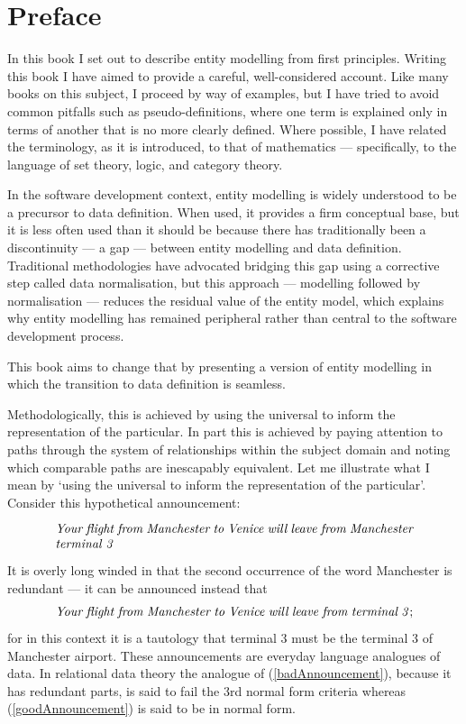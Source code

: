 

\section{Preface}

In this book I set out to describe entity modelling from first principles.
Writing this book I have aimed to provide a careful, well-considered account. 
Like many books on this subject, I proceed by way of examples, but I have tried to avoid common pitfalls such as pseudo-definitions, where one term is explained only in terms of another that is no more clearly defined. Where possible, I have related the terminology, as it is introduced, to that of mathematics --- specifically, to the language of set theory, logic, and category theory.

In the software development context, entity modelling is widely understood to be a precursor to data definition. When used, it provides a firm conceptual base, but it is less often used than it should be because there has traditionally been a discontinuity --- a gap --- between entity modelling and data definition. Traditional methodologies have advocated bridging this gap using a corrective step called data normalisation, but this approach --- modelling followed by normalisation --- reduces the residual value of the entity model, which explains why entity modelling has remained peripheral rather  than  central to the software development process.

This book aims to change that by presenting a version of entity modelling in which the transition to data definition is seamless.

Methodologically, this is achieved by using the universal to inform the representation of the particular.
In part this is achieved by paying attention to paths through the system of relationships within the subject domain and noting which comparable paths are inescapably equivalent. Let me illustrate what I mean by `using the universal to inform the representation of the particular'. Consider this hypothetical announcement: 

\begin{equation}
\label{badAnnouncement}
\parbox{10cm}{\textit{Your flight from Manchester to Venice will leave 
from Manchester terminal 3 }}
\end{equation}

It is overly long winded in that the second occurrence of the word Manchester is redundant --- it can be announced instead that
\begin{equation}
\label{goodAnnouncement}
\parbox{10cm}{\textit{Your flight from Manchester to Venice will leave 
from terminal 3};} 
\end{equation}
for in this context it is a tautology that terminal 3 must be the terminal 3 of Manchester airport. 
These announcements are everyday language analogues of data. In relational data theory the analogue of (\ref{badAnnouncement}),
because it has redundant parts, is said to fail the 3rd normal form criteria whereas (\ref{goodAnnouncement}) is said to be in normal form. 

